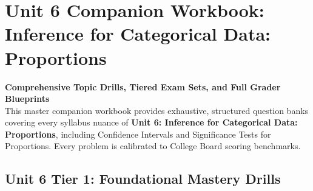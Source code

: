 \chapter{Unit 6 Companion Workbook: Inference for Categorical Data: Proportions}
\label{chap:companion_unit_6}
{\large\bfseries\color{MidnightBlue} Comprehensive Topic Drills, Tiered Exam Sets, and Full Grader Blueprints}\\[8pt]
This master companion workbook provides exhaustive, structured question banks covering every syllabus nuance of \textbf{Unit 6: Inference for Categorical Data: Proportions}, including Confidence Intervals and Significance Tests for Proportions. Every problem is calibrated to College Board scoring benchmarks.\\[12pt]
\section{Unit 6 Tier 1: Foundational Mastery Drills}
